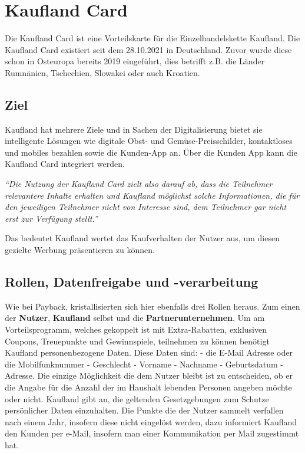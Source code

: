 \section{Kaufland Card}
Die Kaufland Card ist eine Vorteilskarte für die Einzelhandelskette Kaufland. Die Kaufland Card existiert seit dem 28.10.2021 in Deutschland. Zuvor wurde diese schon in Osteuropa bereits 2019 eingeführt, dies betrifft z.B. die Länder Rumnänien, Tschechien, Slowakei oder auch Kroatien. 

\subsection{Ziel}
Kaufland hat mehrere Ziele und in Sachen der Digitalisierung bietet sie intelligente Lösungen wie digitale Obst- und Gemüse-Preisschilder, kontaktloses und mobiles bezahlen sowie die Kunden-App an. Über die Kunden App kann die Kaufland Card integriert werden. \cite{Kaufland_Ziele} \newline

\noindent \textit{``Die Nutzung der Kaufland Card zielt also darauf ab, dass die Teilnehmer relevantere Inhalte erhalten und Kaufland möglichst solche Informationen, die für den jeweiligen Teilnehmer nicht von Interesse sind, dem Teilnehmer gar nicht erst zur Verfügung stellt.'' \cite{Kaufland_Datenschutz}}

Das bedeutet Kaufland wertet das Kaufverhalten der Nutzer aus, um diesen gezielte Werbung präsentieren zu können.

\subsection{Rollen, Datenfreigabe und -verarbeitung}
Wie bei Payback, kristallisierten sich hier ebenfalls drei Rollen heraus. Zum einen der \textbf{Nutzer}, \textbf{Kaufland} selbst und die \textbf{Partnerunternehmen}. 
Um am Vorteilsprogramm, welches gekoppelt ist mit Extra-Rabatten, exklusiven Coupons, Treuepunkte und Gewinnspiele, teilnehmen zu können benötigt Kaufland personenbezogene Daten. Diese Daten sind:\newline
- die E-Mail Adresse oder die Mobilfunknummer\newline
- Geschlecht\newline
- Vorname \newline
- Nachname \newline
- Geburtsdatum \newline
- Adresse. \newline
Die einzige Möglichkeit die dem Nutzer bleibt ist zu entscheiden, ob er die Angabe für die Anzahl der im Haushalt lebenden Personen angeben möchte oder nicht. Kaufland gibt an, die geltenden Gesetzgebungen zum Schutze persönlicher Daten einzuhalten. Die Punkte die der Nutzer sammelt verfallen nach einem Jahr, insofern diese nicht eingelöst werden, dazu informiert Kaufland den Kunden per e-Mail, insofern man einer Kommunikation per Mail zugestimmt hat. \newline

